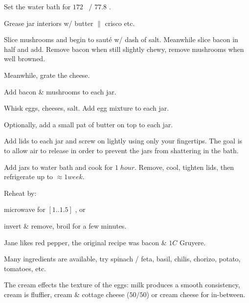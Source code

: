\begin{preparation}
\item Set the water bath for $172$ \Fahrenheit~/ $77.8$ \Celsius.

\item Grease jar interiors w/ butter $\|$ crisco etc.

\item Slice mushrooms and begin to saut\'{e} w/ dash of salt. Meanwhile slice bacon in half and add.
	Remove bacon when still slightly chewy, remove mushrooms when well browned.

\item Meanwhile, grate the cheese.

\item Add bacon \& mushrooms to each jar.

\item Whisk eggs, cheeses, salt. Add egg mixture to each jar.

\item Optionally, add a small pat of butter on top to each jar.

\item Add lids to each jar and screw on lightly using only your fingertips. The goal is to allow air to release in order to prevent the jars from shattering in the bath.

\item Add jars to water bath and cook for $1\; hour$. Remove, cool, tighten lids, then refrigerate up to $\approx1 week$.

\item Reheat by:
\begin{inparaenum}
	\item microwave for $[1..1.5]$ \minute, or
	\item invert \& remove, broil for a few minutes.
\end{inparaenum}

\end{preparation}


\begin{variation}
\item Jane likes red pepper, the original recipe was bacon \& $1 C$ Gruyere.
\item Many ingredients are available, try spinach / feta, basil, chilis, chorizo, potato, tomatoes, etc.
\end{variation}


\begin{experiments}
\item The cream effects the texture of the eggs: milk produces a smooth consistency, cream is fluffier, cream \& cottage cheese ($50/50$) or cream cheese for in-between.
\end{experiments}


\recipeend%
